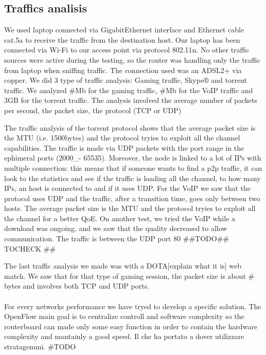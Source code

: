 \documentclass[article,10pt]{IEEEtran}
\begin{document}

  \subsection{Traffics analisis}\label{subsec:traf}
  We used laptop connected via
GigabitEthernet interface and Ethernet cable cat.5a to receive the traffic from the destination host.
Our laptop has been connected via Wi-Fi to our access point via protocol 802.11n.
No other traffic sources were active during the testing, so the router was handling only
the traffic from laptop when sniffing traffic. The connection used was an ADSL2+ via copper.
We did 3 type of traffic analysis: Gaming traffic, Skype® and torrent traffic. We analyzed
\#Mb for the gaming traffic, \#Mb for the VoIP traffic and 3GB for the torrent traffic.
The analysis involved the average number of packets per second, the packet size, the protocol (TCP or UDP)

The traffic analysis of the torrent protocol shows that the average packet size is the MTU
(i.e. 1500bytes) and the protocol tryies to exploit all the channel capabilities. The traffic
is made via UDP packets with the port range in the ephimeral ports (2000_- 65535).
Moreover, the node is linked to a lot of IPs with multiple connection: this means that
if someone wants to find a p2p traffic, it can look to the statistics and see if the traffic is loading all the channel,
to how many IPs, an host is connected to and if it uses UDP.
For the VoIP we saw that the protocol uses UDP and the traffic, after a transition time, goes only between two hosts.
The average packet size is the MTU and the protocol tryies to exploit all the channel for a better QoE.
On another test, we tried the VoIP while a download was ongoing, and we saw that the quality
decreased to allow communication. The traffic is between the UDP port 80 \#\#TODO\#\# TOCHECK \#\#

The last traffic analysis we made was with a DOTA[explain what it is] web match.
We saw that for that type of gaming session, the packet size is about \# bytes and involves both TCP and UDP ports.
  \\
  \\
  For every networks performance we have tryed to develop a specific solution. The OpenFlow main goal is to centralize controll and software
  complexity so the routerboard can made only some easy function in order to contain the hardware complexity and mantainly a good speed\cite{qos_paper}.
  Il che ha portato a dover utilizzare stratagemmi.
  \#TODO %
\end{document}
